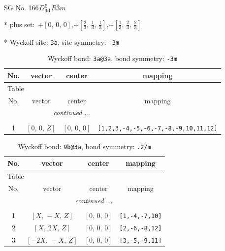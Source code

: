 \documentclass[fleqn,8pt]{jsarticle}
\begin{document}
\setcounter{MaxMatrixCols}{32}

\renewcommand{\tablename}{Table~}
\renewcommand{\figurename}{Figure~}
\begin{center}
\LARGE
SG No. 166\quad$D_{\rm 3d}^{5}$\quad$R\bar{3}m$\quad[ trigonal ]
\end{center}

* plus set:\,\,\,$+\left[ 0,\, 0,\, 0 \right]$,\quad $+\left[ \frac{2}{3},\, \frac{1}{3},\, \frac{1}{3} \right]$,\quad $+\left[ \frac{1}{3},\, \frac{2}{3},\, \frac{2}{3} \right]$


* Wyckoff site: {\tt 3a}, site symmetry: {\tt -3m}
\renewcommand{\arraystretch}{1.2}
\begin{longtable}{cccc}
\caption{Wyckoff bond: {\tt 3a@3a}, bond symmetry: {\tt -3m}}
 \\
 \hline \hline
No. & vector & center & mapping \\ \hline \endfirsthead

\multicolumn{3}{l}{\tablename\ \thetable{}} \\
 \hline \hline
No. & vector & center & mapping \\ \hline \endhead

 \hline \hline
\multicolumn{3}{r}{\footnotesize\it continued ...} \\ \endfoot

 \hline \hline
\multicolumn{3}{r}{} \\ \endlastfoot

1 & $\left[ 0,\, 0,\, Z \right]$ & $\left[ 0,\, 0,\, 0 \right]$ & {\tt [1,2,3,-4,-5,-6,-7,-8,-9,10,11,12]} \\
\end{longtable}
\renewcommand{\arraystretch}{1.2}
\begin{longtable}{cccc}
\caption{Wyckoff bond: {\tt 9b@3a}, bond symmetry: {\tt .2/m}}
 \\
 \hline \hline
No. & vector & center & mapping \\ \hline \endfirsthead

\multicolumn{3}{l}{\tablename\ \thetable{}} \\
 \hline \hline
No. & vector & center & mapping \\ \hline \endhead

 \hline \hline
\multicolumn{3}{r}{\footnotesize\it continued ...} \\ \endfoot

 \hline \hline
\multicolumn{3}{r}{} \\ \endlastfoot

1 & $\left[ X,\, - X,\, Z \right]$ & $\left[ 0,\, 0,\, 0 \right]$ & {\tt [1,-4,-7,10]} \\ \hline
2 & $\left[ X,\, 2 X,\, Z \right]$ & $\left[ 0,\, 0,\, 0 \right]$ & {\tt [2,-6,-8,12]} \\ \hline
3 & $\left[ - 2 X,\, - X,\, Z \right]$ & $\left[ 0,\, 0,\, 0 \right]$ & {\tt [3,-5,-9,11]} \\
\end{longtable}
\end{document}
